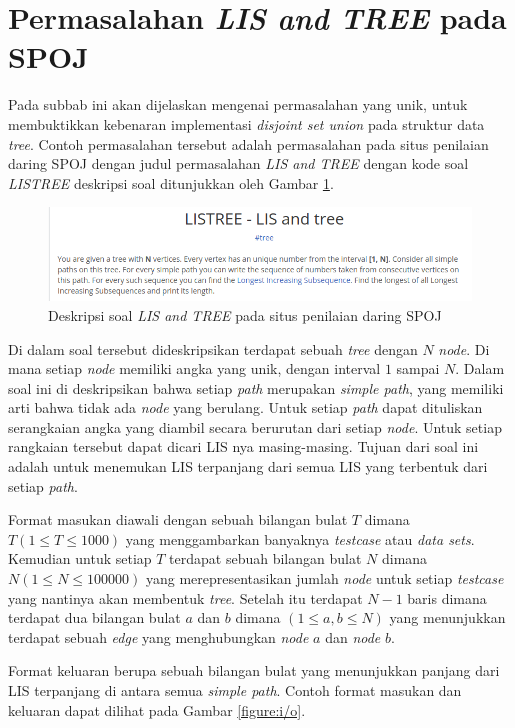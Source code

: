 \section{\quad Permasalahan \textit{LIS and TREE} pada SPOJ}
\quad Pada subbab ini akan dijelaskan mengenai permasalahan yang unik, untuk membuktikkan kebenaran implementasi \textit{disjoint set union} pada struktur data \textit{tree}. Contoh permasalahan tersebut adalah permasalahan pada situs penilaian daring SPOJ dengan judul permasalahan \textit{LIS and TREE} dengan kode soal \textit{LISTREE} deskripsi soal ditunjukkan oleh Gambar \ref{figure:deskripsi}. 
\begin{figure}[H]
	\centerline{ \includegraphics[scale=0.39]{assets/images/deskripsi.png}}
	\caption{Deskripsi soal \textit{LIS and TREE} pada situs penilaian daring SPOJ}
	\label{figure:deskripsi}
\end{figure}
\quad Di dalam soal tersebut dideskripsikan terdapat sebuah \textit{tree} dengan $N$ \textit{node}. Di mana setiap \textit{node} memiliki angka yang unik, dengan interval $1$ sampai $N$. Dalam soal ini di deskripsikan bahwa setiap \textit{path} merupakan \textit{simple path}, yang memiliki arti bahwa tidak ada \textit{node} yang berulang. Untuk setiap \textit{path} dapat dituliskan serangkaian angka yang diambil secara berurutan dari setiap \textit{node}. Untuk setiap rangkaian tersebut dapat dicari LIS nya masing-masing. Tujuan dari soal ini adalah untuk menemukan LIS terpanjang dari semua LIS yang terbentuk dari setiap \textit{path}.

\quad Format masukan diawali dengan sebuah bilangan bulat $T$ dimana $T(1\leq T\leq 1000)$ yang menggambarkan banyaknya \textit{testcase} atau \textit{data sets}. Kemudian untuk setiap $T$ terdapat sebuah bilangan bulat $N$ dimana $N(1\leq N\leq 100000)$ yang merepresentasikan jumlah \textit{node} untuk setiap \textit{testcase} yang nantinya akan membentuk \textit{tree}. Setelah itu terdapat $N-1$ baris dimana terdapat dua bilangan bulat $a$ dan $b$ dimana $(1\leq a,b\leq N)$ yang menunjukkan terdapat sebuah \textit{edge} yang menghubungkan \textit{node} $a$ dan \textit{node} $b$.

\quad Format keluaran berupa sebuah bilangan bulat yang menunjukkan panjang dari LIS terpanjang di antara semua \textit{simple path}. Contoh format masukan dan keluaran dapat dilihat pada Gambar \ref{figure:i/o}. 

